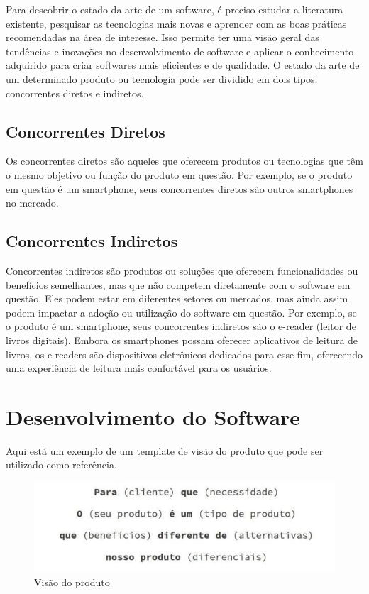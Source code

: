 \documentclass[12pt]{article}
\begin{document}
Para descobrir o estado da arte de um software, é preciso estudar a literatura existente, pesquisar as tecnologias mais novas e aprender com as boas práticas recomendadas na área de interesse. Isso permite ter uma visão geral das tendências e inovações no desenvolvimento de software e aplicar o conhecimento adquirido para criar softwares mais eficientes e de qualidade. O estado da arte de um determinado produto ou tecnologia pode ser dividido em dois tipos: concorrentes diretos e indiretos.
\subsection{Concorrentes Diretos}
Os concorrentes diretos são aqueles que oferecem produtos ou tecnologias que têm o mesmo objetivo ou função do produto em questão. Por exemplo, se o produto em questão é um smartphone, seus concorrentes diretos são outros smartphones no mercado.
\subsection{Concorrentes Indiretos}
Concorrentes indiretos são produtos ou soluções que oferecem funcionalidades ou benefícios semelhantes, mas que não competem diretamente com o software em questão. Eles podem estar em diferentes setores ou mercados, mas ainda assim podem impactar a adoção ou utilização do software em questão. Por exemplo, se o produto é um smartphone, seus concorrentes indiretos são o e-reader (leitor de livros digitais). Embora os smartphones possam oferecer aplicativos de leitura de livros, os e-readers são dispositivos eletrônicos dedicados para esse fim, oferecendo uma experiência de leitura mais confortável para os usuários. 

\section{Desenvolvimento do Software}\label{sec:figs}
Aqui está um exemplo de um template de visão do produto que pode ser utilizado como referência.


\begin{figure}[ht]
\centering
\includegraphics[width=.7\textwidth, scale=6.7]{fig1.jpeg}
\caption{Visão do produto}
\label{fig:typical-figure}
\end{figure}
\end{document}
